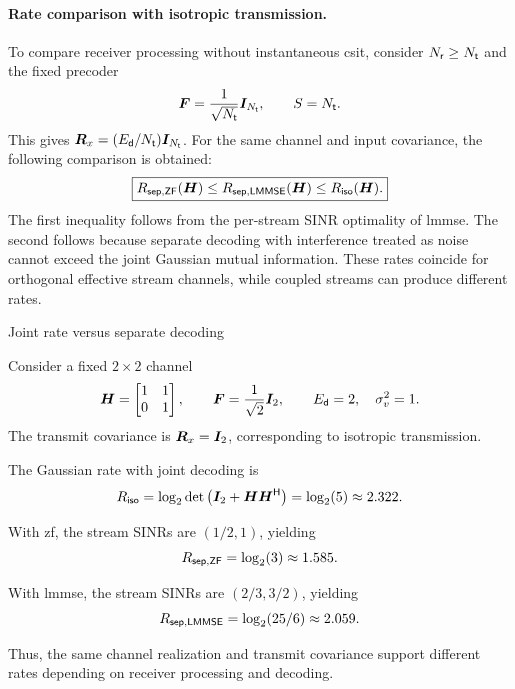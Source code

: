 \paragraph{Rate comparison with isotropic transmission.}
To compare receiver processing without
instantaneous \ac{csit}, consider
$N_{\mathsf{r}}\geq N_{\mathsf{t}}$ and the fixed precoder
\begin{equation*}
	\bm{F}
	=\frac{1}{\sqrt{N_{\mathsf{t}}}}\bm{I}_{N_{\mathsf{t}}},
	\qquad
	S=N_{\mathsf{t}}.
\end{equation*}
This gives
$\bm{R}_x=(E_{\mathsf{d}}/N_{\mathsf{t}})\bm{I}_{N_{\mathsf{t}}}$.
%
For the same channel and input covariance,
the following comparison is obtained:
\begin{equation}\label{eq:rate-comparison}
	\boxed{
		R_{\mathsf{sep},\mathsf{ZF}}(\bm{H})
		\leq
		R_{\mathsf{sep},\mathsf{LMMSE}}(\bm{H})
		\leq
		R_{\mathsf{iso}}(\bm{H}).
	}
\end{equation}
The first inequality follows from the
per-stream SINR optimality of \ac{lmmse}.
The second follows because separate decoding
with interference treated as noise cannot
exceed the joint Gaussian mutual information.
%
These rates coincide for orthogonal effective
stream channels, while coupled streams can
produce different rates.

\begin{example}{Joint rate versus separate decoding}
	
	Consider a fixed $2\times2$ channel
	\begin{equation*}
		\bm{H}
		=
		\begin{bmatrix}
			1&1\\
			0&1
		\end{bmatrix},
		\qquad
		\bm{F}=\frac{1}{\sqrt{2}}\bm{I}_2,
		\qquad
		E_{\mathsf{d}}=2,\quad\sigma_v^2=1.
	\end{equation*}
	The transmit covariance is $\bm{R}_x=\bm{I}_2$,
	corresponding to isotropic transmission.
	
	The Gaussian rate with joint decoding is
	\begin{equation*}
		R_{\mathsf{iso}}
		=\log_2\operatorname{det}\left(\bm{I}_2+\bm{H}{\bm{H}}^{\mathsf{H}}\right)
		=\log_2(5)
		\approx2.322.
	\end{equation*}
	
	With \ac{zf}, the stream SINRs are
	$(1/2,1)$, yielding
	\begin{equation*}
		R_{\mathsf{sep},\mathsf{ZF}}
		=\log_2(3)\approx1.585.
	\end{equation*}
	
	With \ac{lmmse}, the stream SINRs are
	$(2/3,3/2)$, yielding
	\begin{equation*}
		R_{\mathsf{sep},\mathsf{LMMSE}}
		=\log_2(25/6)\approx2.059.
	\end{equation*}
	
	Thus, the same channel realization and transmit
	covariance support different rates depending
	on receiver processing and decoding.
\end{example}

